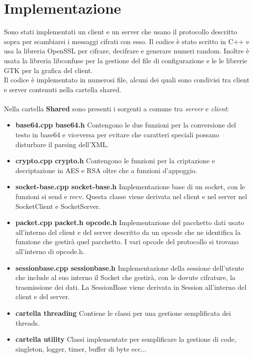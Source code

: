 \documentclass[a4paper,titlepage]{article}
\begin{document}
\newpage
\section{Implementazione}
Sono stati implementati un client e un server che usano il protocollo descritto sopra per scambiarsi i messaggi cifrati con esso. Il codice è stato scritto in C++ e usa la libreria OpenSSL per cifrare, decifrare e generare numeri random.
Inoltre è usata la libreria libconfuse per la gestione del file di configurazione e le le librerie GTK per la grafica del client. \\
Il codice è implementato in numerosi file, alcuni dei quali sono condivisi tra client e server contenuti nella cartella shared. \\
\\
Nella cartella \textbf{Shared} sono presenti i sorgenti a comune tra \textit{server} e \textit{client}:

\begin{itemize}
\item \textbf{base64.cpp base64.h} Contengono le due funzioni per la conversione del testo in base64 e viceversa per evitare che caratteri speciali possano disturbare il parsing dell'XML.
\item \textbf{crypto.cpp crypto.h} Contengono le funzioni per la criptazione e decriptazione in AES e RSA oltre che a funzioni d'appoggio.
\item \textbf{socket-base.cpp socket-base.h} Implementazione base di un socket, con le funzioni si send e recv. Questa classe viene derivata nel client e nel server nel SocketClient e SocketServer.
\item \textbf{packet.cpp packet.h opcode.h} Implementazione del pacchetto dati usato all'interno del client e del server descritto da un opcode che ne identifica la funzione che gestirà quel pacchetto. I vari opcode del protocollo si trovano all'interno di opcode.h.
\item \textbf{sessionbase.cpp sessionbase.h} Implementazione della sessione dell'utente che include al suo interno il Socket che gestirà, con le dovute cifrature, la trasmissione dei dati. La SessionBase viene derivata in Session all'interno del client e del server.
\item \textbf{cartella threading} Contiene le classi per una gestione semplificata dei threads.
\item \textbf{cartella utility} Classi implementate per semplificare la gestione di code, singleton, logger, timer, buffer di byte ecc...
\end{itemize}
\end{document}
